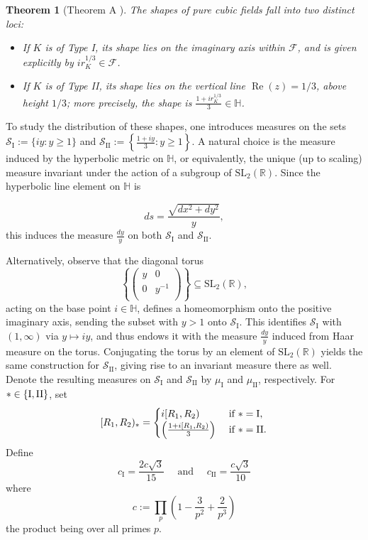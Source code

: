 \documentclass[table]{amsart}
\newtheorem{theorem}{Theorem}[section]
\newcommand\mtx[4] { \left( {\begin{array}{cc}
 #1 & #2 \\
 #3 & #4 \\
 \end{array} } \right)}
\numberwithin{equation}{section}
\begin{document}
\begin{theorem}[Theorem A \cite{Har17}]
The shapes of pure cubic fields fall into two distinct loci:
\begin{itemize}
\item If $K$ is of Type \rm{I}, its shape lies on the imaginary axis within $\mathcal{F}$, and is given explicitly by $i r_K^{1/3} \in \mathcal{F}$.
\item If $K$ is of Type \rm{II}, its shape lies on the vertical line $\operatorname{Re}(z) = 1/3$, above height $1/3$; more precisely, the shape is $\frac{1 + i r_K^{1/3}}{3} \in \mathbb{H}$.
\end{itemize}
\end{theorem}

To study the distribution of these shapes, one introduces measures on the sets $\mathscr{S}_{\mathrm{I}} := \{i y : y \geq 1\}$ and $\mathscr{S}_{\mathrm{II}} := \left\{ \frac{1 + i y}{3} : y \geq 1 \right\}$. A natural choice is the measure induced by the hyperbolic metric on $\mathbb{H}$, or equivalently, the unique (up to scaling) measure invariant under the action of a subgroup of $\mathrm{SL}_2(\mathbb{R})$. Since the hyperbolic line element on $\mathbb{H}$ is

$$
ds = \frac{\sqrt{dx^2 + dy^2}}{y},
$$
\noindent this induces the measure $\frac{dy}{y}$ on both $\mathscr{S}_{\mathrm{I}}$ and $\mathscr{S}_{\mathrm{II}}$. \par Alternatively, observe that the diagonal torus \[\left\{ \mtx{y}{0}{0}{y^{-1}}\right\} \subseteq \mathrm{SL}_2(\mathbb{R}),\]acting on the base point $i \in \mathbb{H}$, defines a homeomorphism onto the positive imaginary axis, sending the subset with $y > 1$ onto $\mathscr{S}_{\mathrm{I}}$. This identifies $\mathscr{S}_{\mathrm{I}}$ with $(1, \infty)$ via $y \mapsto i y$, and thus endows it with the measure $\frac{dy}{y}$ induced from Haar measure on the torus. Conjugating the torus by an element of $\mathrm{SL}_2(\mathbb{R})$ yields the same construction for $\mathscr{S}_{\mathrm{II}}$, giving rise to an invariant measure there as well. Denote the resulting measures on $\mathscr{S}_{\mathrm{I}}$ and $\mathscr{S}_{\mathrm{II}}$ by $\mu_{\mathrm{I}}$ and $\mu_{\mathrm{II}}$, respectively. For $\ast\in \{\rm{I}, \rm{II}\}$, set 
\[[R_1, R_2)_\ast=\begin{cases}
    i[R_1, R_2)&\text{ if }\ast=\rm{I},\\
    \left(\frac{1+i[R_1, R_2)}{3}\right)&\text{ if }\ast=\rm{II}.\\
\end{cases}\]Define
$$
c_{\mathrm{I}}=\frac{2 c \sqrt{3}}{15} \quad \text { and } \quad c_{\mathrm{II}}=\frac{c \sqrt{3}}{10}
$$
where
$$
c:=\prod_{p}\left(1-\frac{3}{p^{2}}+\frac{2}{p^{3}}\right)
$$
the product being over all primes $p$.
\end{document}
